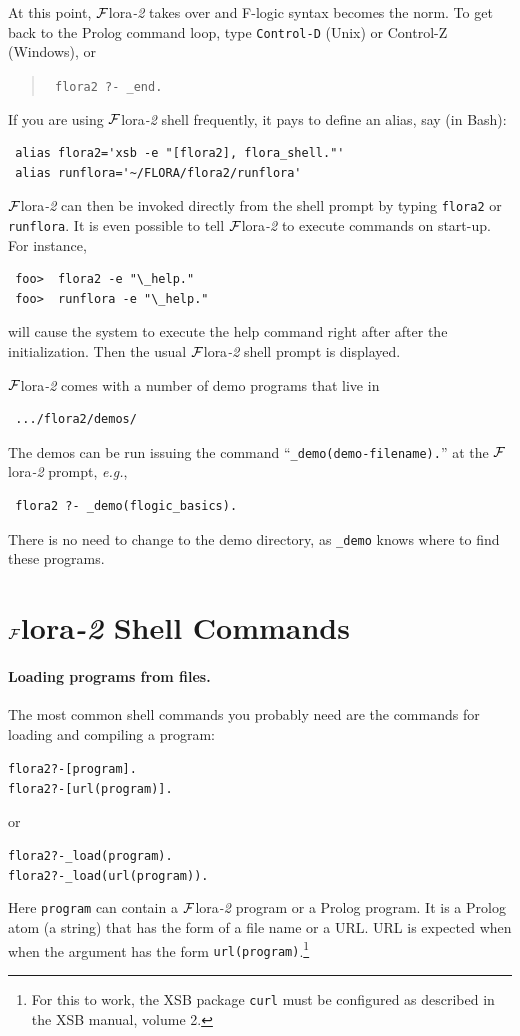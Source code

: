 \documentclass[11pt]{article}
\newcommand{\FLORA}{{\mbox{\sc ${\cal F}${lora}\rm\emph{-2}}}\xspace}
\newcommand{\fl}{\mbox{F-logic}\xspace}
\begin{document}
At this point, \FLORA takes over and \fl syntax becomes the
norm. To get back to the Prolog command loop, type {\tt Control-D} 
(Unix) or Control-Z (Windows), or 
\begin{quote}
  \tt
flora2 ?- \_end.  
\end{quote}

\noindent
If you are using \FLORA shell frequently, it pays to define an alias, say
(in Bash):
\begin{verbatim}
 alias flora2='xsb -e "[flora2], flora_shell."'
 alias runflora='~/FLORA/flora2/runflora'
\end{verbatim}
\FLORA can then be invoked directly from the shell prompt by typing
{\tt flora2} or {\tt runflora}. 
It is even possible to tell \FLORA to execute commands on start-up.
For instance, 
\begin{verbatim}
 foo>  flora2 -e "\_help."
 foo>  runflora -e "\_help."
\end{verbatim}
will cause the system to execute the help command right after after the
initialization. Then the usual \FLORA shell prompt is displayed.

\noindent
\FLORA comes with a number of demo programs that live in
\begin{verbatim}
 .../flora2/demos/
\end{verbatim}
The demos can be run issuing the command
``\verb|_demo(demo-filename).|''
at the \FLORA prompt, {\it e.g.},
\begin{verbatim}
 flora2 ?- _demo(flogic_basics).
\end{verbatim}
There is no need to change to the demo directory, as {\tt \_demo} knows
where to find these programs.


\section{\FLORA Shell Commands} \label{sec-shell-commands}

\paragraph{Loading programs from files.}
The most common shell commands you probably need are the commands for
loading and compiling a program:
\begin{alltt}
  flora2 ?-  [program].
  flora2 ?-  [url(program)].
\end{alltt}
or 
\begin{alltt}
  flora2 ?- _load(program).
  flora2 ?- _load(url(program)).
\end{alltt}
Here {\tt program} can contain a \FLORA program or a Prolog program.
It is a Prolog  atom (a string) that has the form of a file name or a
URL. URL is expected when
when the argument has the form {\tt url(program)}.\footnote{
  For this to work, the XSB package {\tt curl} must be configured as
  described in the XSB manual, volume 2. 
  }
\end{document}
